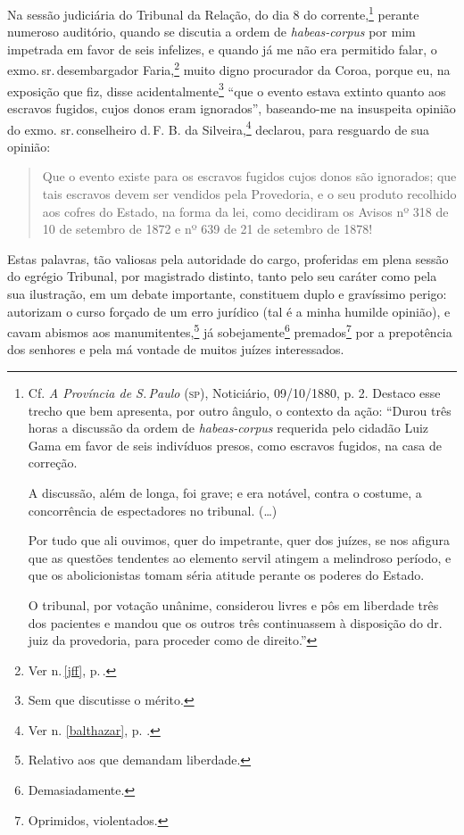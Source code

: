 Na sessão judiciária do Tribunal da Relação, do dia 8 do
corrente,\footnote{Cf. \emph{A Província de S.\,Paulo} (\textsc{sp}), Noticiário,
  09/10/1880, p. 2. Destaco esse trecho que bem apresenta, por outro
  ângulo, o contexto da ação: ``Durou três horas a discussão da ordem de
  \emph{habeas-corpus} requerida pelo cidadão Luiz Gama em favor de seis
  indivíduos presos, como escravos fugidos, na casa de correção.

  A discussão, além de longa, foi grave; e era notável, contra o
  costume, a concorrência de espectadores no tribunal. (\ldots{})

  Por tudo que ali ouvimos, quer do impetrante, quer dos juízes, se nos
  afigura que as questões tendentes ao elemento servil atingem a
  melindroso período, e que os abolicionistas tomam séria atitude
  perante os poderes do Estado.

  O tribunal, por votação unânime, considerou livres e pôs em liberdade
  três dos pacientes e mandou que os outros três continuassem à
  disposição do dr.\,juiz da provedoria, para proceder como de direito.''}
perante numeroso auditório, quando se discutia a ordem de
\emph{habeas-corpus} por mim impetrada em favor de seis infelizes, e
quando já me não era permitido falar, o exmo.\,sr.\,desembargador
Faria,\footnote{Ver n.\,\ref{jff}, p.\,\pageref{jff}.} muito digno procurador da Coroa, porque eu, na
exposição que fiz, disse acidentalmente\footnote{Sem que discutisse o
  mérito.} ``que o evento estava extinto quanto aos escravos fugidos,
cujos donos eram ignorados'', baseando-me na insuspeita opinião do exmo.
sr.\,conselheiro d.\,F. B. da Silveira,\footnote{Ver n. \ref{balthazar}, p. \pageref{balthazar}.} declarou, para resguardo de sua opinião:

\begin{quote}
Que o evento existe para os escravos fugidos cujos donos são ignorados;
que tais escravos devem ser vendidos pela Provedoria, e o seu produto
recolhido aos cofres do Estado, na forma da lei, como decidiram os
Avisos nº 318 de 10 de setembro de 1872 e nº 639 de 21 de setembro de
1878!
\end{quote}

Estas palavras, tão valiosas pela autoridade do cargo, proferidas em
plena sessão do egrégio Tribunal, por magistrado distinto, tanto pelo
seu caráter como pela sua ilustração, em um debate importante,
constituem duplo e gravíssimo perigo: autorizam o curso forçado de um
erro jurídico (tal é a minha humilde opinião), e cavam abismos aos
manumitentes,\footnote{Relativo aos que demandam liberdade.} já
sobejamente\footnote{Demasiadamente.} premados\footnote{Oprimidos,
  violentados.} por a
prepotência dos senhores e pela má vontade de muitos juízes
interessados.

